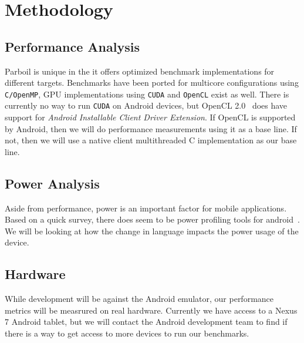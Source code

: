 
\section{Methodology}



\subsection{Performance Analysis}

Parboil is unique in the it offers optimized benchmark implementations for different targets.
Benchmarks have been ported for multicore configurations using {\tt C/OpenMP}, 
	GPU implementations using {\tt CUDA} and {\tt OpenCL} exist as well.
There is currently no way to run {\tt CUDA} on Android devices, but OpenCL 2.0~\cite{OpenCL} does
	have support for \textit{Android Installable Client Driver Extension}.
If OpenCL is supported by Android, then we will do performance measurements using it as a base line.
If not, then we will use a native client multithreaded C implementation as our base line.

\subsection{Power Analysis}

Aside from performance, power is an important factor for mobile applications.
Based on a quick survey, there does seem to be power profiling tools for android~\cite{Google:2014:Power}.
We will be looking at how the change in language impacts the power usage of the device.

\subsection{Hardware}

While development will be against the Android emulator, our performance
	metrics will be measrured on real hardware.
Currently we have access to a Nexus 7 Android tablet, but we will contact
	the Android development team to find if there is a way to get
	access to more devices to run our benchmarks.


